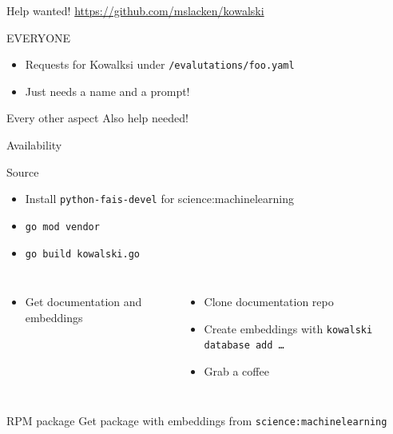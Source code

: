 \documentclass[aspectratio=169]{beamer}
\begin{document}
\begin{frame}{Help wanted!}
\href{https://github.com/mslacken/kowalski}{https://github.com/mslacken/kowalski}
\begin{block}{EVERYONE}
\begin{itemize}
  \item Requests for Kowalksi under \texttt{/evalutations/foo.yaml}
  \item Just needs a name and a prompt!
\end{itemize}
\end{block}
\begin{block}{Every other aspect}
Also help needed!
\end{block}
\end{frame}

\begin{frame}{Availability}
\begin{block}{Source}
\begin{itemize}
  \item Install \texttt{python-fais-devel} for {science:machinelearning}
  \item \texttt{go mod vendor}
  \item \texttt{go build kowalski.go}
\end{itemize}
\begin{columns}
\begin{itemize}
  \item Get documentation and embeddings
\end{itemize}
\begin{itemize}
  \item Clone documentation repo
  \item Create embeddings with \texttt{kowalski database add \dots}
  \item Grab a coffee
\end{itemize}
\end{columns}
\end{block}
\begin{block}{RPM package}
  Get package with embeddings from \texttt{science:machinelearning}
  \hfill
\end{block}
\end{frame}
\end{document}
